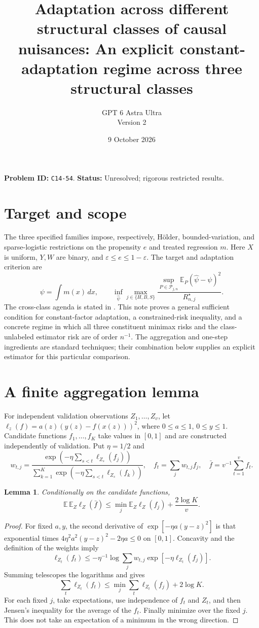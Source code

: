 \documentclass[11pt]{article}
\title{Adaptation across different structural classes of causal nuisances: An explicit constant-adaptation regime across three structural classes}
\author{GPT 6 Astra Ultra\\Version 2}
\date{9 October 2026}
\newtheorem{lemma}[theorem]{Lemma}
\theoremstyle{definition}
\begin{document}
\maketitle
\noindent\textbf{Problem ID:} \texttt{C14-54}. \textbf{Status:} Unresolved; rigorous restricted results.


\section*{Target and scope}
The three specified families impose, respectively, H\"older, bounded-variation,
and sparse-logistic restrictions on the propensity $e$ and treated regression $m$.
Here $X$ is uniform, $Y,W$ are binary, and $\varepsilon\le e\le1-\varepsilon$.
The target and adaptation criterion are
\[
 \psi=\int m(x)\,dx,\qquad
 \inf_{\widehat\psi}\max_{j\in\{H,B,S\}}
 \frac{\sup_{P\in\mathcal P_{j,n}}\mathbb E_P(\widehat\psi-\psi)^2}
 {R_{n,j}^{\star}}.
\]
The cross-class agenda is stated in \cite[Section 3.5.3]{agenda}.
This note proves a general sufficient condition for constant-factor adaptation,
a constrained-risk inequality, and a concrete regime in which all three
constituent minimax risks and the class-unlabeled estimator risk are of order
$n^{-1}$. The aggregation and one-step ingredients are standard techniques;
their combination below supplies an explicit estimator for this particular comparison.

\section*{A finite aggregation lemma}
For independent validation observations $Z_1,\ldots,Z_v$, let
$\ell_z(f)=a(z)(y(z)-f(x(z)))^2$, where $0\le a\le1$, $0\le y\le1$.
Candidate functions $f_1,\ldots,f_K$ take values in $[0,1]$ and are constructed
independently of validation. Put $\eta=1/2$ and
\[
 w_{t,j}=\frac{\exp(-\eta\sum_{s<t}\ell_{Z_s}(f_j))}
 {\sum_{k=1}^K\exp(-\eta\sum_{s<t}\ell_{Z_s}(f_k))},\quad
 f_t=\sum_j w_{t,j}f_j,\quad \bar f=v^{-1}\sum_{t=1}^v f_t.
\]
\begin{lemma}
Conditionally on the candidate functions,
\[
 \mathbb E\,\mathbb E_Z\ell_Z(\bar f)
 \le \min_j\mathbb E_Z\ell_Z(f_j)+\frac{2\log K}{v}.
\]
\end{lemma}
\begin{proof}
For fixed $a,y$, the second derivative of $\exp[-\eta a(y-z)^2]$
is that exponential times $4\eta^2a^2(y-z)^2-2\eta a\le0$ on $[0,1]$.
Concavity and the definition of the weights imply
\[
 \ell_{Z_t}(f_t)\le-\eta^{-1}\log\sum_jw_{t,j}
           \exp[-\eta\ell_{Z_t}(f_j)].
\]
Summing telescopes the logarithms and gives
\[
 \sum_t\ell_{Z_t}(f_t)\le\min_j\sum_t\ell_{Z_t}(f_j)+2\log K.
\]
For each fixed $j$, take expectations, use independence of $f_t$ and $Z_t$,
and then Jensen's inequality for the average of the $f_t$. Finally minimize
over the fixed $j$. This does not take an expectation of a minimum in the
wrong direction.
\end{proof}
\end{document}
